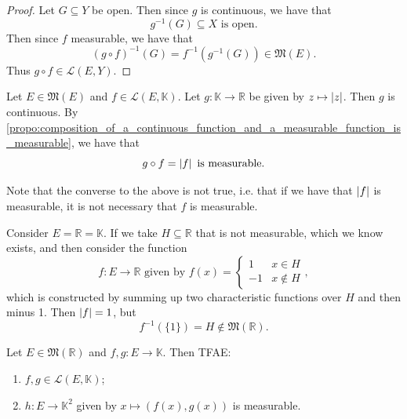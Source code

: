 \documentclass[notoc,notitlepage]{tufte-book}
\begin{document}
\begin{proof}
  Let $G \subseteq Y$ be open. Then since $g$ is continuous, we have that
  \begin{equation*}
    g^{-1}(G) \subseteq X \text{ is open}.
  \end{equation*}
  Then since $f$ measurable, we have that
  \begin{equation*}
    (g \circ f)^{-1}(G) = f^{-1}(g^{-1}(G)) \in \mathfrak{M}(E).
  \end{equation*}
  Thus $g \circ f \in \mathcal{L}(E, Y)$.
\end{proof}

\begin{eg}
  Let $E \in \mathfrak{M}(E)$ and $f \in \mathcal{L}(E, \mathbb{K})$. Let $g :
  \mathbb{K} \to \mathbb{R}$ be given by $z \mapsto \left|z\right|$. Then $g$ is
  continuous. By
  \cref{propo:composition_of_a_continuous_function_and_a_measurable_function_is_measurable},
  we have that
  \begin{equation*}
    g \circ f = \left|f\right| \text{ is measurable}.
  \end{equation*}
\end{eg}

\begin{eg}
  Note that the converse to the above is not true, i.e. that if we have that
  $\left|f\right|$ is measurable, it is not necessary that $f$ is measurable.

  Consider $E = \mathbb{R} = \mathbb{K}$. If we take $H \subseteq \mathbb{R}$ 
  that is not measurable, which we know exists, and then consider the function
  \begin{equation*}
    f : E \to \mathbb{R} \text{ given by } f(x) = \begin{cases}
      1 & x \in H \\
      -1 & x \notin H
    \end{cases},
  \end{equation*}
  which is constructed by summing up two characteristic functions over $H$ and
  then minus 1. Then $\left|f\right| = 1$, but
  \begin{equation*}
    f^{-1}(\{1\}) = H \notin \mathfrak{M}(\mathbb{R}).
  \end{equation*}
\end{eg}

\begin{propo}\label{propo:component_wise_measurability}
  Let $E \in \mathfrak{M}(\mathbb{R})$ and $f, g : E \to \mathbb{K}$. Then TFAE:
  \begin{enumerate}
    \item $f, g \in \mathcal{L}(E, \mathbb{K})$;
    \item $h : E \to \mathbb{K}^2$ given by $x \mapsto (f(x), g(x))$ is
      measurable.
  \end{enumerate}
\end{propo}
\end{document}
